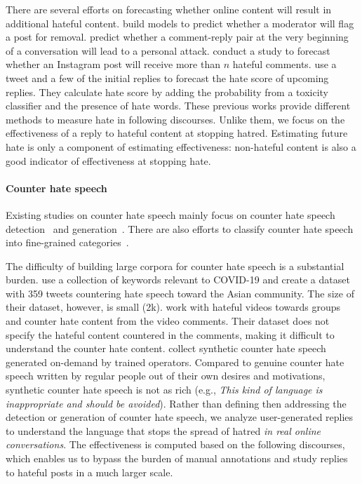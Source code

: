 \documentclass[11pt]{article}
\begin{document}
There are several efforts on forecasting whether online content will result in additional hateful content.
\citet{10.1145/2998181.2998213} build models to predict whether
a moderator will flag a post for removal.
\citet{zhang-etal-2018-conversations} predict whether a comment-reply pair at the very beginning of a conversation will lead to a personal attack.
\citet{DBLP:conf/icwsm/LiuGHC18} conduct a study to forecast whether an Instagram post will receive more than $n$ hateful comments.
\citet{DBLP:conf/kdd/DahiyaSSGCEMB021} use a tweet and a few of the initial replies to forecast the hate score of upcoming replies.
They calculate hate score by adding the probability from a toxicity classifier and the presence of hate words.
These previous works provide different methods to measure hate in following discourses. 
Unlike them, we focus on the effectiveness of a reply to hateful content at stopping hatred.
Estimating future hate is only a component of estimating effectiveness: non-hateful content is also a good indicator of effectiveness at stopping hate.


\paragraph{Counter hate speech}
Existing studies on counter hate speech mainly focus on counter hate speech detection~\cite{DBLP:conf/icwsm/MathewSTRSMG019,chung-etal-2019-conan,he2021racism,garland-etal-2020-countering} 
and generation~\cite{tekiroglu-etal-2020-generating,fanton-etal-2021-human,zhu-bhat-2021-generate}. 
There are also efforts to classify counter hate speech into fine-grained categories~\cite{DBLP:conf/icwsm/MathewSTRSMG019,chung-etal-2021-multilingual}. 

The difficulty of building large corpora for counter hate speech is a substantial burden.
\citet{he2021racism} use a collection of keywords relevant to COVID-19 and create a dataset with 359 tweets countering hate speech
toward the Asian community.
The size of their dataset, however, is small (2k). 
\citet{DBLP:conf/icwsm/MathewSTRSMG019} work with hateful videos towards groups
and counter hate content from the video comments.
Their dataset does not specify the hateful content countered in the comments, making it difficult to understand the counter hate content.
\citet{chung-etal-2019-conan} collect synthetic counter hate speech generated on-demand by trained operators.
Compared to genuine counter hate speech written by regular people out of their own desires and motivations,
synthetic counter hate speech is not as rich (e.g., \emph{This kind of language is inappropriate and should be avoided}).
Rather than defining then addressing the detection or generation of counter hate speech,
we analyze user-generated replies to understand the language that stops the spread of hatred \emph{in real online conversations}.
The effectiveness is computed based on the following discourses, which enables us to bypass the burden of manual annotations and study replies to hateful posts in a much larger scale. 
\end{document}
